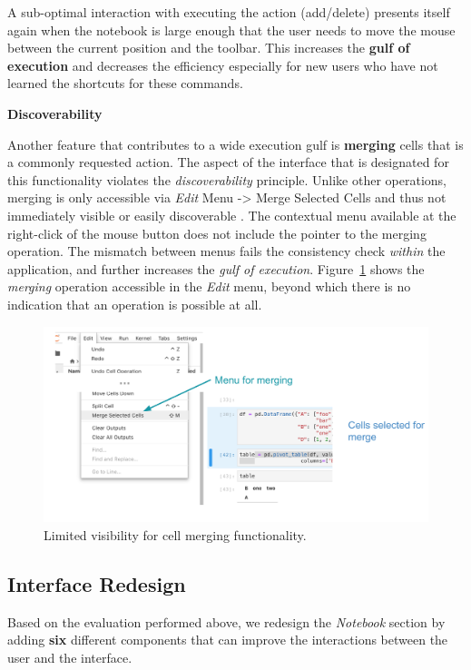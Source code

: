\documentclass[12pt,letterpaper]{article}
\begin{document}
A sub-optimal interaction with executing the action (add/delete) presents itself again when the notebook is large enough that the user needs to move the mouse between the current position and the toolbar. This increases the \textbf{gulf of execution} and decreases the efficiency especially for new users who have not learned the shortcuts for these commands.  


\textbf{Discoverability}

Another feature that contributes to a wide execution gulf is \textbf{merging} cells that is a commonly requested action. The aspect of the interface that is designated for this functionality violates the \textit{discoverability} principle. Unlike other operations, merging is only accessible via \textit{Edit} Menu -> Merge Selected Cells and thus not immediately visible or easily discoverable \cite{jayasimman2011dynamic}. The contextual menu available at the right-click of the mouse button does not include the pointer to the merging operation. The mismatch between menus fails the consistency check \textit{within} the application, and further increases the \textit{gulf of execution}.  Figure~\ref{fig::3} shows the \textit{merging} operation accessible in the \textit{Edit} menu, beyond which there is no indication that an operation is possible at all.

\begin{figure}[hbt!]
\centering
\includegraphics[scale=.4]{figures/project-principles/cell_merge_eval.png}
\caption{Limited visibility for cell merging functionality.}
\label{fig::3}
\end{figure}


\subsection*{Interface Redesign}
Based on the evaluation performed above, we redesign the \textit{Notebook} section by adding \textbf{six} different components that can improve the interactions between the user and the interface.
\end{document}
